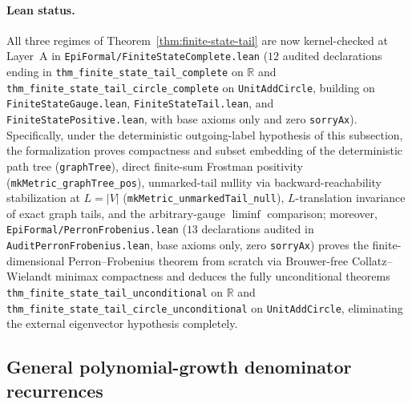 \documentclass[11pt]{article}
\theoremstyle{definition}
\theoremstyle{remark}
\newcommand{\R}{\mathbb{R}}
\begin{document}
\paragraph{Lean status.}
All three regimes of Theorem~\ref{thm:finite-state-tail} are now kernel-checked at Layer~A in
\texttt{EpiFormal/\allowbreak Finite\allowbreak State\allowbreak Complete.lean} ($12$ audited declarations
ending in \texttt{thm\_\allowbreak finite\_\allowbreak state\_\allowbreak tail\_\allowbreak complete} on $\R$
and \texttt{thm\_\allowbreak finite\_\allowbreak state\_\allowbreak tail\_\allowbreak circle\_\allowbreak complete}
on \texttt{UnitAddCircle}, building on \texttt{Finite\allowbreak State\allowbreak Gauge.lean},
\texttt{Finite\allowbreak State\allowbreak Tail.lean}, and
\texttt{Finite\allowbreak State\allowbreak Positive.lean}, with base axioms only and zero \texttt{sorryAx}).
Specifically, under the deterministic outgoing-label hypothesis of this subsection, the formalization proves
compactness and subset embedding of the deterministic path tree (\texttt{graphTree}),
direct finite-sum Frostman positivity (\texttt{mkMetric\_\allowbreak graphTree\_\allowbreak pos}),
unmarked-tail nullity via backward-reachability stabilization at $L=|V|$ (\texttt{mkMetric\_\allowbreak unmarkedTail\_\allowbreak null}),
$L$-translation invariance of exact graph tails, and the arbitrary-gauge $\liminf$ comparison;
moreover, \texttt{EpiFormal/\allowbreak PerronFrobenius.lean} ($13$ declarations audited in \texttt{AuditPerronFrobenius.lean}, base axioms only, zero \texttt{sorryAx}) proves the finite-dimensional Perron--Frobenius theorem from scratch via Brouwer-free Collatz--Wielandt minimax compactness and deduces the fully unconditional theorems \texttt{thm\_\allowbreak finite\_\allowbreak state\_\allowbreak tail\_\allowbreak unconditional} on $\R$ and \texttt{thm\_\allowbreak finite\_\allowbreak state\_\allowbreak tail\_\allowbreak circle\_\allowbreak unconditional} on \texttt{UnitAddCircle}, eliminating the external eigenvector hypothesis completely.

\subsection{General polynomial-growth denominator recurrences}\label{sec:poly-rec}
\end{document}

